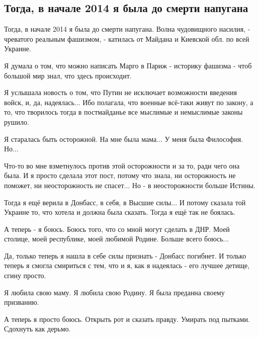  
 
 
 
 
\subsection{Тогда, в начале 2014 я была до смерти напугана}
\label{sec:15_05_2021.fb.felbush_olena.1.2014_maidan}

Тогда, в начале 2014 я была до смерти напугана. Волна чудовищного насилия, -
чреватого реальным фашизмом, - катилась от Майдана и Киевской обл. по всей
Украине.

Я думала о том, что можно написать Марго в Париж - историку фашизма - чтоб
большой мир знал, что здесь происходит.

Я услышала новость о том, что Путин не исключает возможности введения войск, и,
да, надеялась... Ибо полагала, что военные всё-таки живут по закону, а то, что
творилось тогда в постмайданье все мыслимые и немыслимые законы рушило.

Я старалась быть осторожной. На мне была мама... У меня была Философия. Но...

Что-то во мне взметнулось против этой осторожности и за то, ради чего она была.
И я просто сделала этот пост, потому что знала, ни осторожность не поможет, ни
неосторожность не спасет... Но - в неосторожности больше Истины.

Тогда я ещё верила в Донбасс, в себя, в Высшие силы... И потому сказала той
Украине то, что хотела и должна была сказать. Тогда я ещё так не боялась.

А теперь - я боюсь. Боюсь того, что со мной могут сделать в ДНР. Моей столице,
моей республике, моей любимой Родине. Больше всего боюсь...

Да, только теперь я нашла в себе силы признать - Донбасс погибнет. И только
теперь я смогла смириться с тем, что и я, как я надеялась - его лучшее детище,
сгину просто.

Я любила свою маму. Я любила свою Родину. Я была преданна своему призванию.

А теперь я просто боюсь. Открыть рот и сказать правду. Умирать под пытками. Сдохнуть как дерьмо.

